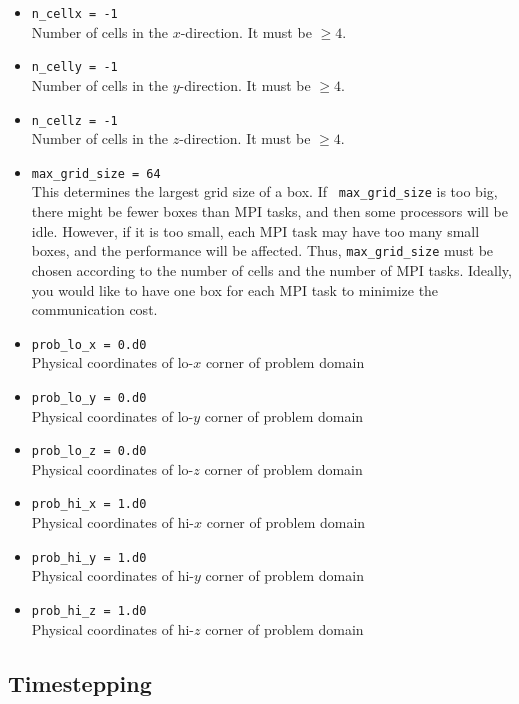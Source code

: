 \documentclass[11pt,letterpaper]{article}
\begin{document}
\begin{itemize}
\item {\tt n\_cellx = -1}\\
  Number of cells in the $x$-direction.  It must be $\ge 4$.
\item {\tt n\_celly = -1}\\
  Number of cells in the $y$-direction.  It must be $\ge 4$.
\item {\tt n\_cellz = -1}\\
  Number of cells in the $z$-direction.  It must be $\ge 4$.
\item {\tt max\_grid\_size = 64}\\
  This determines the largest grid size of a box.  If {\tt
    max\_grid\_size} is too big, there might be fewer boxes than MPI
  tasks, and then some processors will be idle.  However, if it is too
  small, each MPI task may have too many small boxes, and the
  performance will be affected.  Thus, {\tt max\_grid\_size} must be
  chosen according to the number of cells and the number of MPI tasks.
  Ideally, you would like to have one box for each MPI task to
  minimize the communication cost.
\item {\tt prob\_lo\_x = 0.d0}\\
  Physical coordinates of lo-$x$ corner of problem domain
\item {\tt prob\_lo\_y = 0.d0}\\
  Physical coordinates of lo-$y$ corner of problem domain
\item {\tt prob\_lo\_z = 0.d0}\\
  Physical coordinates of lo-$z$ corner of problem domain
\item {\tt prob\_hi\_x = 1.d0}\\
  Physical coordinates of hi-$x$ corner of problem domain
\item {\tt prob\_hi\_y = 1.d0}\\
  Physical coordinates of hi-$y$ corner of problem domain
\item {\tt prob\_hi\_z = 1.d0}\\
  Physical coordinates of hi-$z$ corner of problem domain
\end{itemize}

\subsection{Timestepping}
\end{document}
